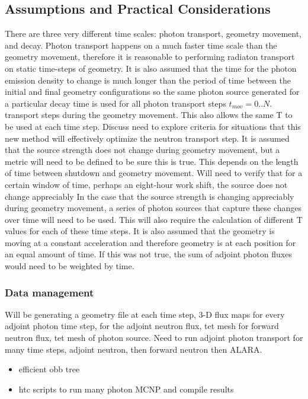 \subsection{Assumptions and Practical Considerations}
There are three very different time scales: photon transport,
geometry movement, and decay.  Photon transport happens on a much
faster time scale than the geometry movement, therefore it is reasonable to
performing radiaton transport on static time-steps of geometry.  It is also assumed that the
time for the photon emission density to change is much longer than the
period of time between the initial and final geometry configurations so the 
same photon source generated for a particular decay time
is used for all photon transport steps $t_{mov} = 0..N$.
transport steps during the geometry movement. 
This also allows the same T to be used at each time step.
Discuss need to explore criteria for situations that this new method will
effectively optimize the neutron transport step.
It is assumed that the source strength does not change during geometry
movement, but a metric will need to be defined to be sure this is true.
This depends on the length of time between shutdown and geometry movement.
Will need to verify that for a certain window of time, perhaps an eight-hour
work shift, the source does not change appreciably 
In the case that the source strength is changing appreciably during geometry
movement, a  series of photon sources that capture these changes over time
will need to be used.  This will also require the calculation of different T
values for each of these time steps.
It is also assumed that the geometry is moving at a constant acceleration
and therefore geometry is at each position for an equal amount of time.  If
this was not true, the sum of adjoint photon fluxes would need to be weighted
by time. 

\subsubsection{Data management}
Will be generating a geometry file at each time step, 3-D flux maps for every adjoint
		photon time step, for the adjoint neutron flux, tet mesh for
		forward neutron flux, tet mesh of photon source. Need to run
		adjoint photon transport for many time steps, adjoint neutron,
		then forward neutron then ALARA.
\begin{itemize}
        \item efficient obb tree
	\item htc scripts to run many photon MCNP and compile results
\end{itemize}


